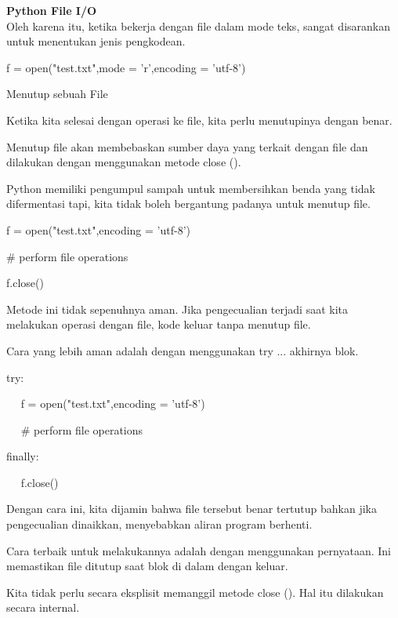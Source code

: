 \begin{center}{\fontsize{24pt}{24pt}\selectfont \textbf{Python File I/O} \\}
Oleh karena itu, ketika bekerja dengan file dalam mode teks, sangat disarankan untuk menentukan jenis pengkodean. 
\vspace{12pt}

f = open("test.txt",mode = 'r',encoding = 'utf-8') 
\vspace{12pt}
 
Menutup sebuah File 
\vspace{12pt}

Ketika kita selesai dengan operasi ke file, kita perlu menutupinya dengan benar. 
\vspace{12pt}
 
Menutup file akan membebaskan sumber daya yang terkait dengan file dan dilakukan dengan menggunakan metode close (). 
\vspace{12pt}

Python memiliki pengumpul sampah untuk membersihkan benda yang tidak difermentasi tapi, kita tidak boleh bergantung padanya untuk menutup file. 

f = open("test.txt",encoding = 'utf-8') 

 $  \#  $ perform file operations 
 
f.close() 
\vspace{16pt}
 
Metode ini tidak sepenuhnya aman. Jika pengecualian terjadi saat kita melakukan operasi dengan file, kode keluar tanpa menutup file. 
\vspace{12pt}

Cara yang lebih aman adalah dengan menggunakan try ... akhirnya blok. 
\vspace{12pt}

try: 

~~ f = open("test.txt",encoding = 'utf-8') 

~~  $  \#  $ perform file operations 

finally: 

~~ f.close() 
\vspace{12pt}

Dengan cara ini, kita dijamin bahwa file tersebut benar tertutup bahkan jika pengecualian dinaikkan, menyebabkan aliran program berhenti. 
\vspace{12pt}

Cara terbaik untuk melakukannya adalah dengan menggunakan pernyataan. Ini memastikan file ditutup saat blok di dalam dengan keluar. 
\vspace{12pt}

Kita tidak perlu secara eksplisit memanggil metode close (). Hal itu dilakukan secara internal. 
\vspace{12pt}


\end{center}
